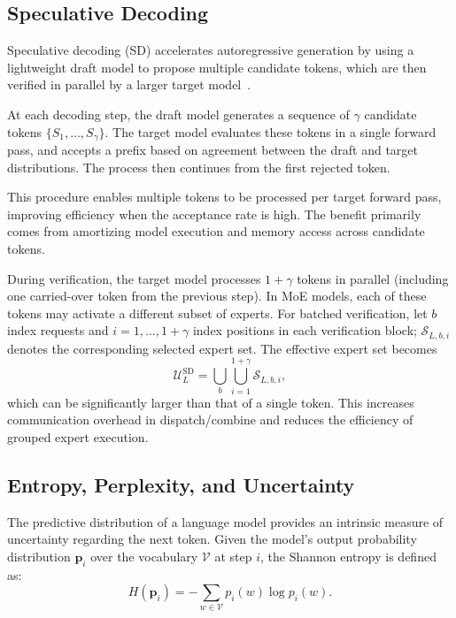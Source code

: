 \documentclass[conference]{IEEEtran}
\theoremstyle{definition} %
\begin{document}
\subsection{Speculative Decoding}

Speculative decoding (SD) accelerates autoregressive generation by using a lightweight draft model to propose multiple candidate tokens, which are then verified in parallel by a larger target model~\cite{stern2018blockwise,leviathan2023spec,chen2023spec}.

At each decoding step, the draft model generates a sequence of $\gamma$ candidate tokens $\{S_1, \dots, S_\gamma\}$. The target model evaluates these tokens in a single forward pass, and accepts a prefix based on agreement between the draft and target distributions. The process then continues from the first rejected token.

This procedure enables multiple tokens to be processed per target forward pass, improving efficiency when the acceptance rate is high. The benefit primarily comes from amortizing model execution and memory access across candidate tokens.

During verification, the target model processes $1+\gamma$ tokens in parallel (including one carried-over token from the previous step). In MoE models, each of these tokens may activate a different subset of experts. For batched verification, let $b$ index requests and $i=1,\dots,1+\gamma$ index positions in each verification block; $\mathcal{S}_{L,b,i}$ denotes the corresponding selected expert set. The effective expert set becomes
\begin{equation*}
\mathcal{U}_L^{\text{SD}} = \bigcup_b \bigcup_{i=1}^{1+\gamma} \mathcal{S}_{L,b,i},
\end{equation*}
which can be significantly larger than that of a single token. This increases communication overhead in dispatch/combine and reduces the efficiency of grouped expert execution.

\subsection{Entropy, Perplexity, and Uncertainty}
\label{sec:bg:uncertainty}

The predictive distribution of a language model provides an intrinsic measure of uncertainty regarding the next token.
Given the model's output probability distribution $\mathbf{p}_i$ over the vocabulary $\mathcal{V}$ at step $i$, the Shannon entropy is defined as:
\begin{equation*}
H(\mathbf{p}_i) = -\sum_{w \in \mathcal{V}} p_i(w) \log p_i(w).
\end{equation*}
\end{document}
